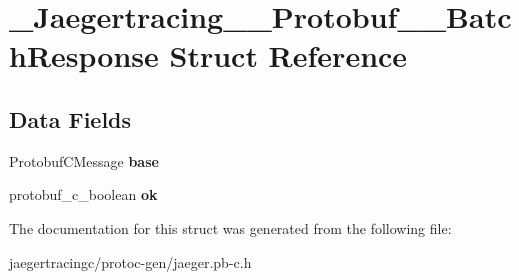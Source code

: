 \hypertarget{struct__Jaegertracing____Protobuf____BatchResponse}{}\section{\+\_\+\+Jaegertracing\+\_\+\+\_\+\+Protobuf\+\_\+\+\_\+\+Batch\+Response Struct Reference}
\label{struct__Jaegertracing____Protobuf____BatchResponse}
\subsection*{Data Fields}
\begin{DoxyCompactItemize}
\item 
\mbox{\label{struct__Jaegertracing____Protobuf____BatchResponse_a60d471d72f383d2fc7bea3d6f548daab}} 
Protobuf\+C\+Message {\bfseries base}
\item 
\mbox{\label{struct__Jaegertracing____Protobuf____BatchResponse_a8da19ccf0e7189a1197acee1dbd37f8f}} 
protobuf\+\_\+c\+\_\+boolean {\bfseries ok}
\end{DoxyCompactItemize}


The documentation for this struct was generated from the following file\+:\begin{DoxyCompactItemize}
\item 
jaegertracingc/protoc-\/gen/jaeger.\+pb-\/c.\+h\end{DoxyCompactItemize}
